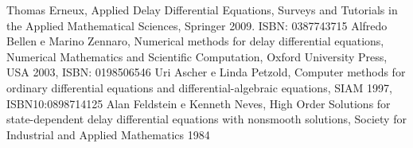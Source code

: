 

\begin{thebibliography}{1}
  Thomas Erneux, Applied Delay Differential Equations, Surveys and Tutorials in the Applied
			      Mathematical Sciences, Springer 2009. ISBN: 0387743715
  Alfredo Bellen e Marino Zennaro, Numerical methods for delay differential equations, 
		  Numerical Mathematics and Scientific Computation, 
		  Oxford University Press, USA 2003, ISBN: 0198506546
 Uri Ascher e Linda Petzold, Computer methods for ordinary differential 
				equations and differential-algebraic equations, SIAM 1997, ISBN10:0898714125
  Alan Feldstein e Kenneth Neves, High Order Solutions for state-dependent delay differential equations with nonsmooth solutions, 
		  Society for Industrial and Applied Mathematics 1984
\end{thebibliography}

